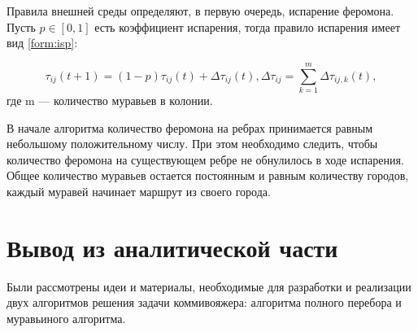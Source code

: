 Правила внешней среды определяют, в первую очередь, испарение феромона. Пусть $p \in [0, 1]$ есть коэффициент испарения, тогда правило испарения имеет вид
\ref{form:isp}:

\begin{equation}
	\label{form:isp}
	\tau_{ij}(t+1) = (1-p)\tau_{ij}(t) + \Delta \tau_{ij}(t), \Delta \tau_{ij} = \sum_{k=1}^m \Delta \tau_{ij, k}(t),
\end{equation}
где m — количество муравьев в колонии.

В начале алгоритма количество феромона на ребрах принимается равным небольшому положительному числу. При этом необходимо следить, чтобы количество феромона на существующем ребре не обнулилось в ходе испарения. Общее количество муравьев остается постоянным и равным количеству городов, каждый муравей начинает маршрут из своего города. 


\section{Вывод из аналитической части}
Были рассмотрены идеи и материалы, необходимые для  разработки и реализации двух алгоритмов решения задачи коммивояжера: алгоритма полного перебора и муравьиного алгоритма.

